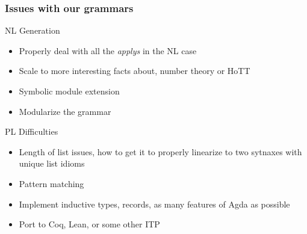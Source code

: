 \documentclass[9pt]{beamer}
\begin{document}
\begin{frame}
\frametitle{Issues with our grammars}

\begin{block}{NL Generation}
\begin{itemize}
\item Properly deal with all the \emph{applys} in the NL case
\item Scale to more interesting facts about, number theory or HoTT 
\item Symbolic module extension
\item Modularize the grammar
\end{itemize}
\end{block}

\begin{block}{PL Difficulties}
\begin{itemize}
\item Length of list issues, how to get it to properly linearize to two sytnaxes with unique list idioms 
\item Pattern matching
\item Implement inductive types, records, as many features of Agda as possible
\item Port to Coq, Lean, or some other ITP
\end{itemize}
\end{block}
\end{frame}
\end{document}
